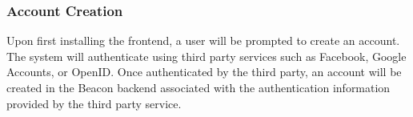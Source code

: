         \subsubsection{Account Creation}
            Upon first installing the frontend, a user will be prompted to create an
            account. The system will authenticate using third party services such as
            Facebook, Google Accounts, or OpenID. Once authenticated by the third party,
            an account will be created in the Beacon backend associated with the
            authentication information provided by the third party service.
